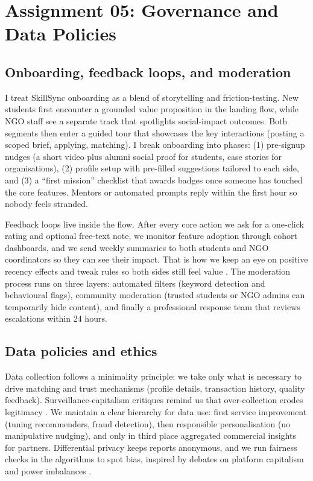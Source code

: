 \section*{Assignment 05: Governance and Data Policies}

\subsection*{Onboarding, feedback loops, and moderation}
I treat SkillSync onboarding as a blend of storytelling and friction-testing. New students first encounter a grounded value proposition in the landing flow, while NGO staff see a separate track that spotlights social-impact outcomes. Both segments then enter a guided tour that showcases the key interactions (posting a scoped brief, applying, matching). I break onboarding into phases: (1) pre-signup nudges (a short video plus alumni social proof for students, case stories for organisations), (2) profile setup with pre-filled suggestions tailored to each side, and (3) a ``first mission'' checklist that awards badges once someone has touched the core features. Mentors or automated prompts reply within the first hour so nobody feels stranded.

Feedback loops live inside the flow. After every core action we ask for a one-click rating and optional free-text note, we monitor feature adoption through cohort dashboards, and we send weekly summaries to both students and NGO coordinators so they can see their impact. That is how we keep an eye on positive recency effects and tweak rules so both sides still feel value \citep{Reillier2017}. The moderation process runs on three layers: automated filters (keyword detection and behavioural flags), community moderation (trusted students or NGO admins can temporarily hide content), and finally a professional response team that reviews escalations within 24 hours.

\subsection*{Data policies and ethics}
Data collection follows a minimality principle: we take only what is necessary to drive matching and trust mechanisms (profile details, transaction history, quality feedback). Surveillance-capitalism critiques remind us that over-collection erodes legitimacy \citep{Zuboff2019}. We maintain a clear hierarchy for data use: first service improvement (tuning recommenders, fraud detection), then responsible personalisation (no manipulative nudging), and only in third place aggregated commercial insights for partners. Differential privacy keeps reports anonymous, and we run fairness checks in the algorithms to spot bias, inspired by debates on platform capitalism and power imbalances \citep{Srnicek2017}.

